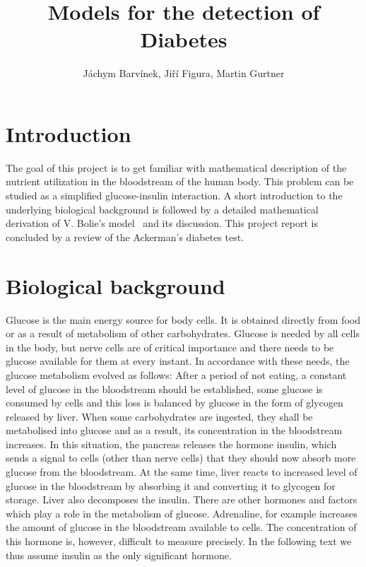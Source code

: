 \documentclass{article}
\begin{document}
\title{Models for the detection of Diabetes}
\author{J\'achym Barv\'inek, Ji\v r\'i Figura, Martin Gurtner}

\maketitle

\section{Introduction}

The goal of this project is to get familiar with mathematical description of the nutrient utilization in the bloodstream of the human body. This problem can be studied as a simplified glucose-insulin interaction.
A short introduction to the underlying biological background is followed by a detailed mathematical derivation of V. Bolie's model~\cite{bolie1961coefficients} and its discussion. This project report is concluded by a review of the Ackerman's diabetes test. 

\section{Biological background}

Glucose is the main energy source for body cells. It is obtained directly from food or as a result of metabolism of other carbohydrates. Glucose is needed by all cells in the body, but nerve cells are of critical importance and there needs
to be glucose available for them at every instant. In accordance with these needs, the glucose
metabolism evolved as follows:
After a period of not eating, a constant level of glucose in the bloodstream should be established,
some glucose is consumed by cells and this loss is balanced by glucose in the form of glycogen
released by liver. When some carbohydrates are ingested, they shall be metabolised into glucose
and as a result, its concentration in the bloodstream increases. In this situation, the pancreas
releases the hormone insulin, which sends a signal to cells (other than nerve cells) that they should
now absorb more glucose from the bloodstream. At the same time, liver reacts to increased level of 
glucose in the bloodstream by absorbing it and converting it to glycogen for storage. Liver also 
decomposes the insulin. There are other hormones and factors which play a role in the metabolism
of glucose. Adrenaline, for example increases the amount of glucose in the bloodstream available
to cells. The concentration of this hormone is, however, difficult to measure precisely.
In the following text we thus assume insulin as the only significant hormone.
\end{document}
